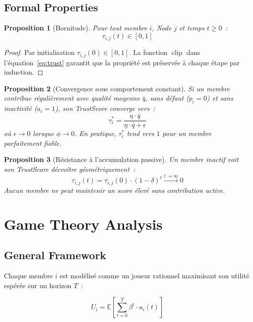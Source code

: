 \documentclass[12pt,a4paper]{article}
\theoremstyle{definition}
\theoremstyle{plain}
\newtheorem{proposition}{Proposition}[section]
\theoremstyle{remark}
\newcommand{\trustscore}{\tau}
\newcommand{\E}{\mathbb{E}}
\newcommand{\1}{\mathbf{1}}
\newcommand{\clip}{\operatorname{clip}}
\begin{document}
\subsection{Formal Properties}

\begin{proposition}[Bornitude]
Pour tout membre $i$, Node $j$ et temps $t \geq 0$~:
$$\trustscore_{i,j}(t) \in [0, 1]$$
\end{proposition}

\begin{proof}
Par initialisation $\trustscore_{i,j}(0) \in [0,1]$. La fonction $\clip$ dans
l'équation~\eqref{eq:trust} garantit que la propriété est préservée à chaque
étape par induction.
\end{proof}

\begin{proposition}[Convergence sous comportement constant]
Si un membre contribue régulièrement avec qualité moyenne $\bar{q}$, sans
défaut ($p_i = 0$) et sans inactivité ($a_i = 1$), son TrustScore converge
vers~:
$$\trustscore_i^* = \frac{\eta \cdot \bar{q}}{\eta \cdot \bar{q} + \epsilon}$$
où $\epsilon \to 0$ lorsque $\phi \to 0$. En pratique, $\trustscore_i^*$ tend
vers $1$ pour un membre parfaitement fiable.
\end{proposition}

\begin{proposition}[Résistance à l'accumulation passive]
Un membre inactif voit son TrustScore décroître géométriquement~:
$$\trustscore_{i,j}(t) = \trustscore_{i,j}(0) \cdot (1-\delta)^t \xrightarrow{t \to \infty} 0$$
Aucun membre ne peut maintenir un score élevé sans contribution active.
\end{proposition}

\section{Game Theory Analysis}
\label{sec:jeux}

\subsection{General Framework}

Chaque membre $i$ est modélisé comme un joueur rationnel maximisant son
utilité espérée sur un horizon $T$~:

\begin{equation}
U_i = \E\left[\sum_{t=0}^{T} \beta^t \cdot u_i(t)\right]
\label{eq:utility}
\end{equation}
\end{document}
